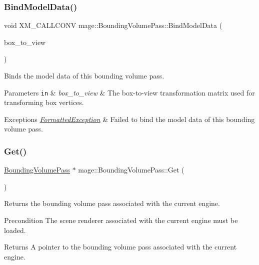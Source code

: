 \subsubsection{\texorpdfstring{Bind\+Model\+Data()}{BindModelData()}}
{\footnotesize\ttfamily void X\+M\+\_\+\+C\+A\+L\+L\+C\+O\+NV mage\+::\+Bounding\+Volume\+Pass\+::\+Bind\+Model\+Data (\begin{DoxyParamCaption}\item[{F\+X\+M\+M\+A\+T\+R\+IX}]{box\+\_\+to\+\_\+view }\end{DoxyParamCaption})\hspace{0.3cm}{\ttfamily [private]}}

Binds the model data of this bounding volume pass.


\begin{DoxyParams}[1]{Parameters}
\mbox{\tt in}  & {\em box\+\_\+to\+\_\+view} & The box-\/to-\/view transformation matrix used for transforming box vertices. \\
\hline
\end{DoxyParams}

\begin{DoxyExceptions}{Exceptions}
{\em \hyperlink{classmage_1_1_formatted_exception}{Formatted\+Exception}} & Failed to bind the model data of this bounding volume pass. \\
\hline
\end{DoxyExceptions}
\hypertarget{classmage_1_1_bounding_volume_pass_a254c44c1c9f18967c9d6cdb6e53d3bcd}{}\label{classmage_1_1_bounding_volume_pass_a254c44c1c9f18967c9d6cdb6e53d3bcd} 
\subsubsection{\texorpdfstring{Get()}{Get()}}
{\footnotesize\ttfamily \hyperlink{classmage_1_1_bounding_volume_pass}{Bounding\+Volume\+Pass} $\ast$ mage\+::\+Bounding\+Volume\+Pass\+::\+Get (\begin{DoxyParamCaption}{ }\end{DoxyParamCaption})\hspace{0.3cm}{\ttfamily [static]}}

Returns the bounding volume pass associated with the current engine.

\begin{DoxyPrecond}{Precondition}
The scene renderer associated with the current engine must be loaded. 
\end{DoxyPrecond}
\begin{DoxyReturn}{Returns}
A pointer to the bounding volume pass associated with the current engine. 
\end{DoxyReturn}
\hypertarget{classmage_1_1_bounding_volume_pass_a2115e9af06e0bc7e42fc95e10f0dacad}{}\label{classmage_1_1_bounding_volume_pass_a2115e9af06e0bc7e42fc95e10f0dacad} 
